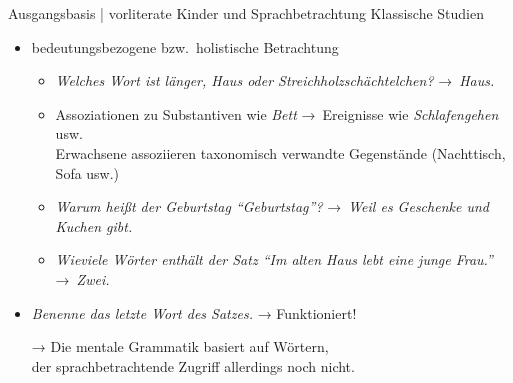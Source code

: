 \begin{frame}
  {Ausgangsbasis | vorliterate Kinder und Sprachbetrachtung}
  \onslide<+->
  \onslide<+->
  Klassische Studien \\
  \Halbzeile
  \onslide<+->
  \begin{itemize}[<+->]
    \item \alert{bedeutungsbezogene} bzw.\ \alert{holistische} Betrachtung
      \Viertelzeile
      \begin{itemize}
        \item \textit{Welches Wort ist länger, Haus oder Streichholzschächtelchen?} →\ \textit{Haus.}
          \Viertelzeile
        \item Assoziationen zu Substantiven wie \textit{Bett} →\ \alert{Ereignisse} wie \textit{Schlafengehen} usw.\\
          Erwachsene assoziieren \alert{taxonomisch verwandte Gegenstände} (Nachttisch, Sofa usw.)
          \Viertelzeile
        \item \textit{Warum heißt der Geburtstag  "`Geburtstag"'?} →\ \textit{Weil es Geschenke und Kuchen gibt.}
          \Viertelzeile
        \item \textit{Wieviele Wörter enthält der Satz "`Im alten Haus lebt eine junge Frau."'} →\ \textit{Zwei.}
      \end{itemize}
      \Halbzeile
    \item \textit{Benenne das letzte Wort des Satzes.} → Funktioniert!
      \Halbzeile
    \item[→] Die mentale Grammatik basiert auf Wörtern,\\
      der sprachbetrachtende Zugriff allerdings noch nicht.
  \end{itemize}
\end{frame}

